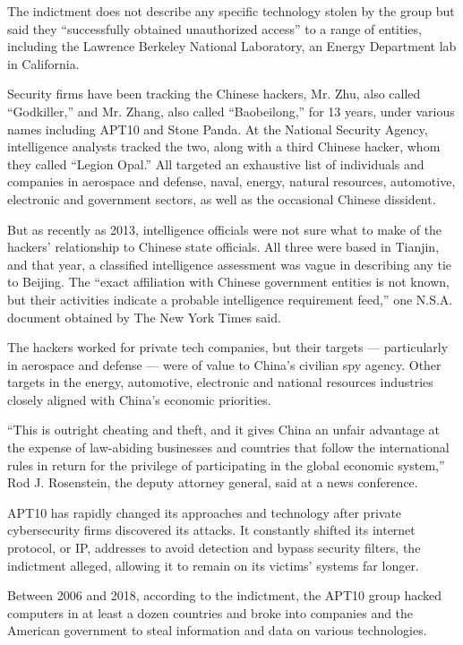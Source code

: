 The indictment does not describe any specific technology stolen by the
group but said they ``successfully obtained unauthorized access'' to a
range of entities, including the Lawrence Berkeley National Laboratory,
an Energy Department lab in California.

Security firms have been tracking the Chinese hackers, Mr. Zhu, also
called ``Godkiller,'' and Mr. Zhang, also called ``Baobeilong,'' for 13
years, under various names including APT10 and Stone Panda. At the
National Security Agency, intelligence analysts tracked the two, along
with a third Chinese hacker, whom they called ``Legion Opal.'' All
targeted an exhaustive list of individuals and companies in aerospace
and defense, naval, energy, natural resources, automotive, electronic
and government sectors, as well as the occasional Chinese dissident.

But as recently as 2013, intelligence officials were not sure what to
make of the hackers' relationship to Chinese state officials. All three
were based in Tianjin, and that year, a classified intelligence
assessment was vague in describing any tie to Beijing. The ``exact
affiliation with Chinese government entities is not known, but their
activities indicate a probable intelligence requirement feed,'' one
N.S.A. document obtained by The New York Times said.

The hackers worked for private tech companies, but their targets ---
particularly in aerospace and defense --- were of value to China's
civilian spy agency. Other targets in the energy, automotive, electronic
and national resources industries closely aligned with China's economic
priorities.

``This is outright cheating and theft, and it gives China an unfair
advantage at the expense of law-abiding businesses and countries that
follow the international rules in return for the privilege of
participating in the global economic system,'' Rod J. Rosenstein, the
deputy attorney general, said at a news conference.

APT10 has rapidly changed its approaches and technology after private
cybersecurity firms discovered its attacks. It constantly shifted its
internet protocol, or IP, addresses to avoid detection and bypass
security filters, the indictment alleged, allowing it to remain on its
victims' systems far longer.

Between 2006 and 2018, according to the indictment, the APT10 group
hacked computers in at least a dozen countries and broke into companies
and the American government to steal information and data on various
technologies.

